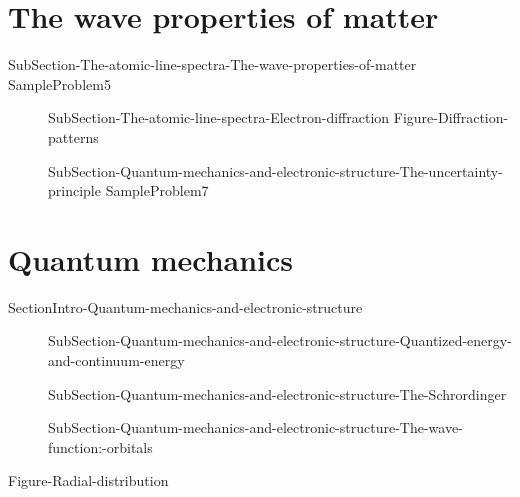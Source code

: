 \documentclass[main.tex]{subfiles}
\begin{document}
\section{The wave properties of matter}{SubSection-The-atomic-line-spectra-The-wave-properties-of-matter}
 \hspace{-9em}{Figure-Debroglie}
{SampleProblem5}
\sloppy\begin{description}
\item[]{SubSection-The-atomic-line-spectra-Electron-diffraction}
{Figure-Diffraction-patterns}
\item[] {SubSection-Quantum-mechanics-and-electronic-structure-The-uncertainty-principle}
{SampleProblem7}
\end{description}


\section{Quantum mechanics}{SectionIntro-Quantum-mechanics-and-electronic-structure}
\sloppy\begin{description}
\item[] {SubSection-Quantum-mechanics-and-electronic-structure-Quantized-energy-and-continuum-energy}
\item[] {SubSection-Quantum-mechanics-and-electronic-structure-The-Schrordinger}
\item[] {SubSection-Quantum-mechanics-and-electronic-structure-The-wave-function:-orbitals}
\end{description}


 {Figure-Radial-distribution}  
\end{document}
